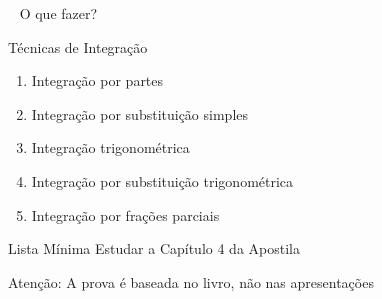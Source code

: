 \begin{frame}{~}
  \Large
  O que fazer?
\end{frame}

\begin{frame}{Técnicas de Integração}
\begin{enumerate}[<+->]
  \setlength\itemsep{1em}
  \item Integração por partes
  \item Integração por substituição simples
  \item Integração trigonométrica
  \item Integração por substituição trigonométrica
  \item Integração por frações parciais
\end{enumerate}
\end{frame}

\begin{frame}{Lista Mínima}
  Estudar a Capítulo 4 da Apostila

  \vfill
  Atenção: A prova é baseada no livro, não nas apresentações
\end{frame}


